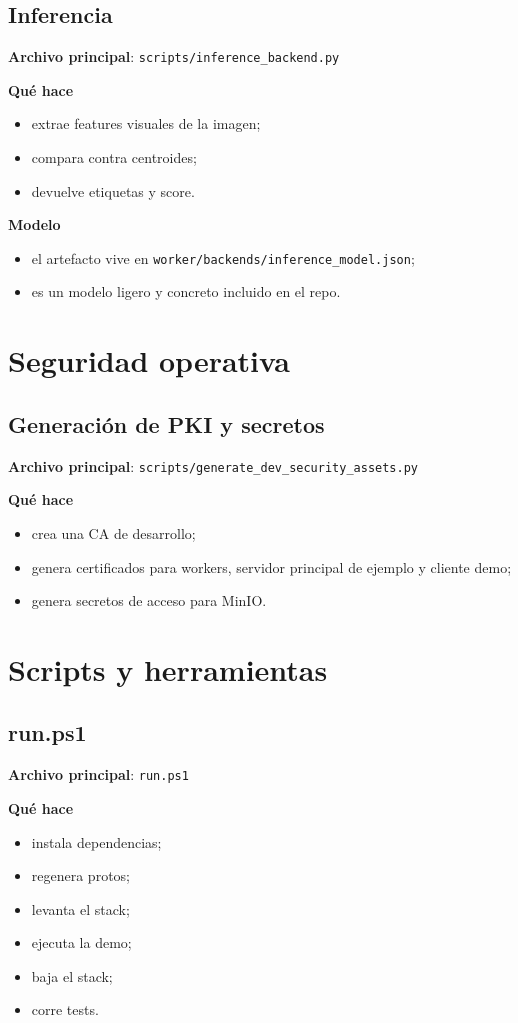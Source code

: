 \documentclass[11pt]{article}
\begin{document}
\subsection{Inferencia}
\textbf{Archivo principal}: \texttt{scripts/inference\_backend.py}

\textbf{Qué hace}
\begin{itemize}
\item extrae features visuales de la imagen;
\item compara contra centroides;
\item devuelve etiquetas y score.
\end{itemize}

\textbf{Modelo}
\begin{itemize}
\item el artefacto vive en \texttt{worker/backends/inference\_model.json};
\item es un modelo ligero y concreto incluido en el repo.
\end{itemize}

\section{Seguridad operativa}

\subsection{Generación de PKI y secretos}
\textbf{Archivo principal}: \texttt{scripts/generate\_dev\_security\_assets.py}

\textbf{Qué hace}
\begin{itemize}
\item crea una CA de desarrollo;
\item genera certificados para workers, servidor principal de ejemplo y cliente demo;
\item genera secretos de acceso para MinIO.
\end{itemize}

\section{Scripts y herramientas}

\subsection{run.ps1}
\textbf{Archivo principal}: \texttt{run.ps1}

\textbf{Qué hace}
\begin{itemize}
\item instala dependencias;
\item regenera protos;
\item levanta el stack;
\item ejecuta la demo;
\item baja el stack;
\item corre tests.
\end{itemize}
\end{document}
